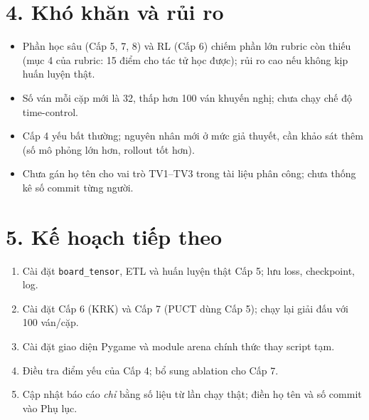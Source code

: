 \documentclass[13pt,a4paper]{extreport}
\newcommand{\code}[1]{\texttt{#1}}
\begin{document}
\section*{4. Khó khăn và rủi ro}
\begin{itemize}
\item Phần học sâu (Cấp 5, 7, 8) và RL (Cấp 6) chiếm phần lớn rubric còn thiếu (mục 4 của rubric: 15 điểm cho tác tử học được); rủi ro cao nếu không kịp huấn luyện thật.
\item Số ván mỗi cặp mới là 32, thấp hơn 100 ván khuyến nghị; chưa chạy chế độ time-control.
\item Cấp 4 yếu bất thường; nguyên nhân mới ở mức giả thuyết, cần khảo sát thêm (số mô phỏng lớn hơn, rollout tốt hơn).
\item Chưa gán họ tên cho vai trò TV1--TV3 trong tài liệu phân công; chưa thống kê số commit từng người.
\end{itemize}

\section*{5. Kế hoạch tiếp theo}
\begin{enumerate}
\item Cài đặt \code{board\_tensor}, ETL và huấn luyện thật Cấp 5; lưu loss, checkpoint, log.
\item Cài đặt Cấp 6 (KRK) và Cấp 7 (PUCT dùng Cấp 5); chạy lại giải đấu với 100 ván/cặp.
\item Cài đặt giao diện Pygame và module arena chính thức thay script tạm.
\item Điều tra điểm yếu của Cấp 4; bổ sung ablation cho Cấp 7.
\item Cập nhật báo cáo \emph{chỉ} bằng số liệu từ lần chạy thật; điền họ tên và số commit vào Phụ lục.
\end{enumerate}
\end{document}
